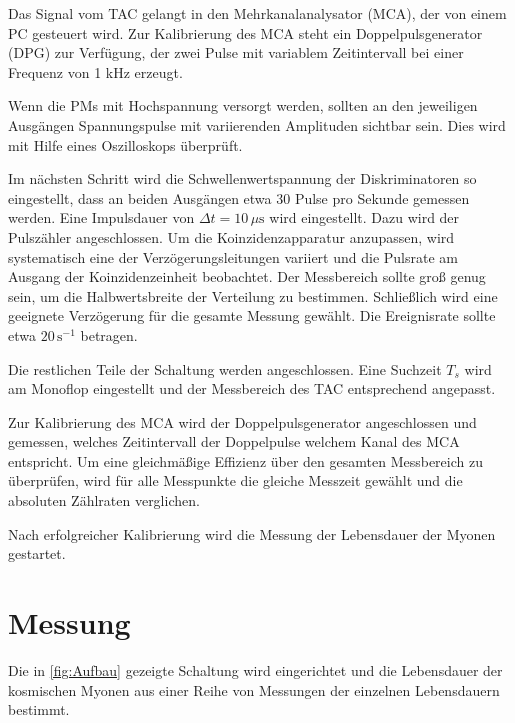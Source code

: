 Das Signal vom TAC gelangt in den Mehrkanalanalysator (MCA), der von einem PC gesteuert wird. Zur Kalibrierung des MCA steht ein Doppelpulsgenerator (DPG) zur Verfügung, der zwei Pulse mit variablem Zeitintervall bei einer Frequenz von 1 kHz erzeugt.

Wenn die PMs mit Hochspannung versorgt werden, sollten an den jeweiligen Ausgängen Spannungspulse mit variierenden Amplituden sichtbar sein. Dies wird mit Hilfe eines Oszilloskops überprüft.

Im nächsten Schritt wird die Schwellenwertspannung der Diskriminatoren so eingestellt, dass an beiden Ausgängen etwa 30 Pulse pro Sekunde gemessen werden. Eine Impulsdauer von $\Delta t = 10 \, \mu\text{s}$ wird eingestellt. Dazu wird der Pulszähler angeschlossen. Um die Koinzidenzapparatur anzupassen, wird systematisch eine der Verzögerungsleitungen variiert und die Pulsrate am Ausgang der Koinzidenzeinheit beobachtet. Der Messbereich sollte groß genug sein, um die Halbwertsbreite der Verteilung zu bestimmen. Schließlich wird eine geeignete Verzögerung für die gesamte Messung gewählt. Die Ereignisrate sollte etwa $20 \, \text{s}^{-1}$ betragen.

Die restlichen Teile der Schaltung werden angeschlossen. Eine Suchzeit $T_s$ wird am Monoflop eingestellt und der Messbereich des TAC entsprechend angepasst.

Zur Kalibrierung des MCA wird der Doppelpulsgenerator angeschlossen und gemessen, welches Zeitintervall der Doppelpulse welchem Kanal des MCA entspricht. Um eine gleichmäßige Effizienz über den gesamten Messbereich zu überprüfen, wird für alle Messpunkte die gleiche Messzeit gewählt und die absoluten Zählraten verglichen.

Nach erfolgreicher Kalibrierung wird die Messung der Lebensdauer der Myonen gestartet.

\section{Messung}

Die in \autoref{fig:Aufbau} gezeigte Schaltung wird eingerichtet und die Lebensdauer der kosmischen Myonen aus einer Reihe von Messungen der einzelnen Lebensdauern bestimmt.

